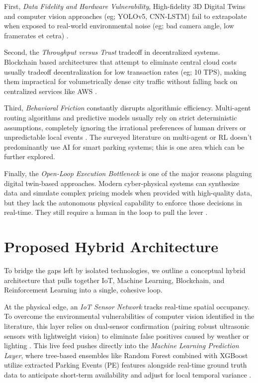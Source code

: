 \documentclass[conference]{IEEEtran}
\begin{document}
First, \textit{Data Fidelity and Hardware Vulnerability}, High-fidelity 3D Digital Twins and computer vision approaches (eg; YOLOv5, CNN-LSTM) fail to extrapolate when exposed to real-world environmental noise (eg; bad camera angle, low framerates et cetra) \cite{b7,b13}. 

Second, the \textit{Throughput versus Trust} tradeoff in decentralized systems. Blockchain based architectures that attempt to eliminate central cloud costs usually tradeoff decentralization for low transaction rates (eg; 10 TPS), making them impractical for volumetrically dense city traffic without falling back on centralized services like AWS \cite{b27,b39}. 

Third, \textit{Behavioral Friction} constantly disrupts algorithmic efficiency. Multi-agent routing algorithms and predictive models usually rely on strict deterministic assumptions, completely ignoring the irrational preferences of human drivers or unpredictable local events \cite{b23,b29}. The surveyed literature on multi-agent or RL doesn't predominantly use AI for smart parking systems; this is one area which can be further explored. 

Finally, the \textit{Open-Loop Execution Bottleneck} is one of the major reasons plaguing digital twin-based approaches. Modern cyber-physical systems can synthesize data and simulate complex pricing models when provided with high-quality data, but they lack the autonomous physical capability to enforce those decisions in real-time. They still require a human in the loop to pull the lever \cite{b1,b20}.

\section{Proposed Hybrid Architecture}
To bridge the gaps left by isolated technologies, we outline a conceptual hybrid architecture that pulls together IoT, Machine Learning, Blockchain, and Reinforcement Learning into a single, cohesive loop.

At the physical edge, an \textit{IoT Sensor Network} tracks real-time spatial occupancy. To overcome the environmental vulnerabilities of computer vision identified in the literature, this layer relies on dual-sensor confirmation (pairing robust ultrasonic sensors with lightweight vision) to eliminate false positives caused by weather or lighting \cite{b2,b3}. This live feed pushes directly into the \textit{Machine Learning Prediction Layer}, where tree-based ensembles like Random Forest combined with XGBoost utilize extracted Parking Events (PE) features alongside real-time ground truth data to anticipate short-term availability and adjust for local temporal variance \cite{b12}.
\end{document}

